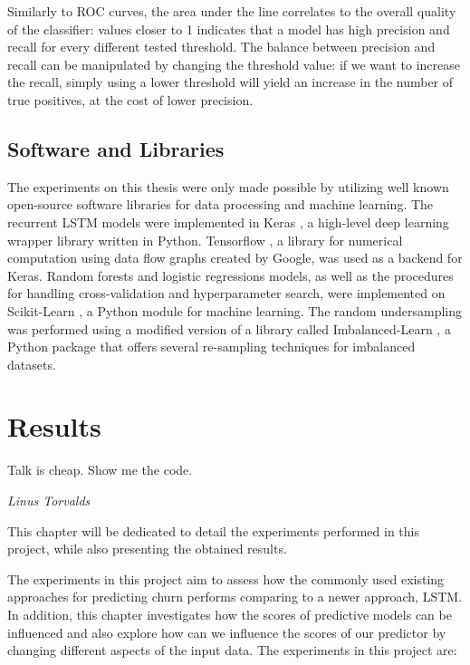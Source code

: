 \documentclass{kththesis}
\begin{document}
Similarly to ROC curves, the area under the line correlates to the overall quality of the classifier: values closer to 1 indicates that a model has high precision and recall for every different tested threshold.  The balance between precision and recall can be manipulated by changing the threshold value: if we want to increase the recall, simply using a lower threshold will yield an increase in the number of true positives, at the cost of lower precision.

\section{Software and Libraries}

The experiments on this thesis were only made possible by utilizing well known open-source software libraries for data processing and machine learning. The recurrent LSTM models were implemented in Keras \citep{chollet2015keras}, a high-level deep learning wrapper library written in Python.  Tensorflow \citep{abadi2016tensorflow}, a library for numerical computation using data flow graphs created by Google, was used as a backend for Keras. Random forests and logistic regressions models, as well as  the procedures for handling cross-validation and hyperparameter search, were implemented on Scikit-Learn \citep{scikit-learn}, a Python module for machine learning. The random undersampling was performed using a modified version of a library called Imbalanced-Learn \citep{lema2017imbalanced}, a Python package that offers several re-sampling techniques for imbalanced datasets. 

\chapter{Results}
\label{cha:results}

\epigraph{Talk is cheap. Show me the code.}{\textit{Linus Torvalds}}

This chapter will be dedicated to detail the experiments performed in this project, while also presenting the obtained results.

The experiments in this project aim to assess how the commonly used existing approaches for predicting churn performs comparing to a newer approach, LSTM. In addition, this chapter investigates how the scores of predictive models can be influenced and also explore how can we influence the scores of our predictor by changing different aspects of the input data. The experiments in this project are:
\end{document}
